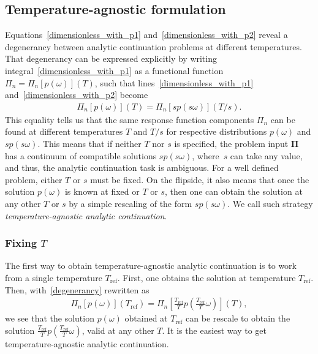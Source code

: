 \documentclass[notitlepage, 11pt, nofootinbib]{revtex4-1}
\renewcommand{\vec}[1]{\bm{#1}}
\begin{document}
\subsection{Temperature-agnostic formulation}
\label{section_temperature_agnostic}
Equations~\eqref{dimensionless_with_p1} and~\eqref{dimensionless_with_p2} reveal a degenerancy between analytic continuation problems at different temperatures.
That degenerancy can be expressed explicitly by writing integral~\eqref{dimensionless_with_p1} as a functional function $\Pi_n = \Pi_n[p(\omega)](T)$, such that lines~\eqref{dimensionless_with_p1} and~\eqref{dimensionless_with_p2} become 
\begin{align}
\Pi_n[p(\omega)](T) = \Pi_n[sp(s\omega)](T/s).
\label{degenerancy}
\end{align}
This equality tells us that the same response function components $\Pi_n$ can be found at different temperatures $T$ and $T/s$ for respective distributions $p(\omega)$ and $sp(s\omega)$. 
This means that if neither $T$ nor $s$ is specified, the problem input $\vec \Pi$ has a continuum of compatible solutions $sp(s\omega)$, where~$s$ can take any value, and thus, the analytic continuation task is ambiguous.
For a well defined problem, either $T$ or $s$ must be fixed.
On the flipside, it also means that once the solution $p(\omega)$ is known at fixed or $T$ or $s$, then one can obtain the solution at any other $T$ or $s$ by a simple rescaling of the form $sp(s\omega)$.
We call such strategy \emph{temperature-agnostic analytic continuation}.

\subsubsection{Fixing $T$}
The first way to obtain temperature-agnostic analytic continuation is to work from a single temperature $T_\text{ref}$. First, one obtains the solution at temperature $T_\text{ref}$. Then, with~\eqref{degenerancy} rewritten as
\begin{align}
    \Pi_n[p(\omega)](T_\text{{ref}}) = \Pi_n[\tfrac{T_{\text{ref}}}{T} p(\tfrac{T_{\text{ref}}}{T}\omega)](T),
    \label{eq_fix_T}
\end{align}
we see that the solution $p(\omega)$ obtained at $T_\text{ref}$ can be rescale to obtain the solution $\tfrac{T_{\text{ref}}}{T} p(\tfrac{T_{\text{ref}}}{T}\omega)$, valid at any other $T$. It is the easiest way to get temperature-agnostic analytic continuation.
\end{document}
